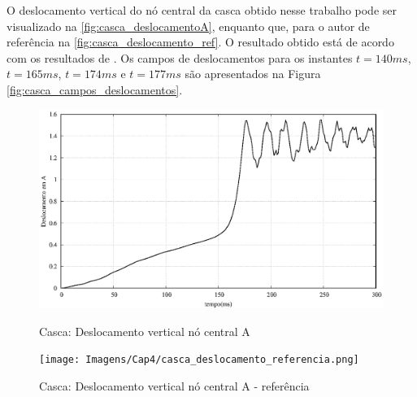 O deslocamento vertical do nó central da casca obtido nesse trabalho pode ser visualizado na \autoref{fig:casca_deslocamentoA}, enquanto que, para o autor de referência na \autoref{fig:casca_deslocamento_ref}. O resultado obtido está de acordo com os resultados de . Os campos de deslocamentos para os instantes $t = 140ms$, $t = 165ms$, $t = 174ms$ e $t = 177ms$ são apresentados na Figura \ref{fig:casca_campos_deslocamentos}.

\begin{figure}[!htbp]
	\caption{Casca: Deslocamento vertical nó central A}
	\centering
	{\includegraphics[scale=.6, trim=0cm 0cm 0cm 0cm, clip=true]{Imagens/Cap4/casca_deslocamentoA.eps}}
	\label{fig:casca_deslocamentoA}
\end{figure}

\begin{figure}[!htbp]
	\caption{Casca: Deslocamento vertical nó central A - referência}
	\centering
	{\texttt{[image: Imagens/Cap4/casca\_deslocamento\_referencia.png]}}
	\label{fig:casca_deslocamento_ref}
\end{figure}

